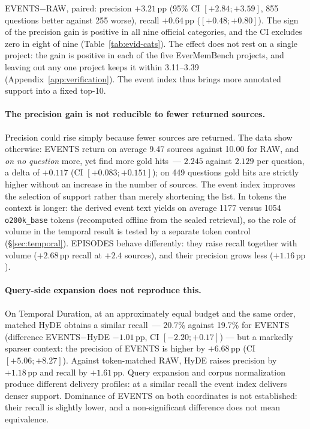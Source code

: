 \documentclass[11pt,a4paper]{article}
\newcommand{\raw}{RAW}
\newcommand{\events}{EVENTS}
\newcommand{\episodes}{EPISODES}
\newcommand{\pp}{\,\text{pp}}
\begin{document}
\events{}$-$\raw{}, paired: precision $+3.21\pp$ (95\% CI $[+2.84;+3.59]$, 855
questions better against 255 worse), recall $+0.64\pp$ ($[+0.48;+0.80]$). The sign of
the precision gain is positive in all nine official categories, and the CI excludes
zero in eight of nine (Table~\ref{tab:evid-cats}). The effect does not rest on a
single project: the gain is positive in each of the five EverMemBench projects, and
leaving out any one project keeps it within 3.11--3.39\pp{}
(Appendix~\ref{app:verification}). The event index thus brings more annotated support
into a fixed top-10.

\paragraph{The precision gain is not reducible to fewer returned sources.}
Precision could rise simply because fewer sources are returned. The data show
otherwise: \events{} return on average 9.47 sources against 10.00 for \raw{}, and
\emph{on no question} more, yet find more gold hits~--- $2.245$ against $2.129$ per
question, a delta of $+0.117$ (CI $[+0.083;+0.151]$); on 449 questions gold hits are
strictly higher without an increase in the number of sources. The event index
improves the selection of support rather than merely shortening the list. In tokens
the context is longer: the derived event text yields on average 1177 versus 1054
\texttt{o200k\_base} tokens (recomputed offline from the sealed retrieval), so the
role of volume in the temporal result is tested by a separate token control
(§\ref{sec:temporal}). \episodes{} behave differently: they raise recall together with
volume ($+2.68\pp$ recall at $+2.4$ sources), and their precision grows less
($+1.16\pp$).

\paragraph{Query-side expansion does not reproduce this.}
On Temporal Duration, at an approximately equal budget and the same order, matched
HyDE obtains a similar recall~--- 20.7\% against 19.7\% for \events{} (difference
EVENTS$-$HyDE $-1.01\pp$, CI $[-2.20;+0.17]$) --- but a markedly sparser context: the
precision of \events{} is higher by $+6.68\pp$ (CI $[+5.06;+8.27]$). Against
token-matched \raw{}, HyDE raises precision by $+1.18\pp$ and recall by $+1.61\pp$.
Query expansion and corpus normalization produce different delivery profiles: at a
similar recall the event index delivers denser support. Dominance of \events{} on
both coordinates is not established: their recall is slightly lower, and a
non-significant difference does not mean equivalence.
\end{document}
